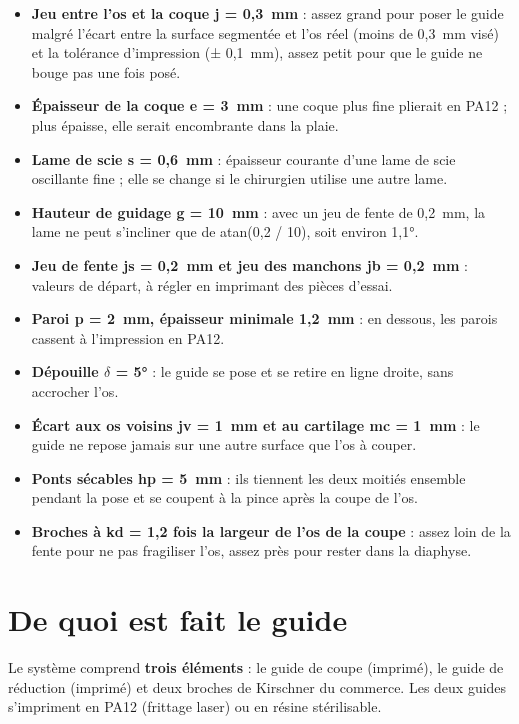 \documentclass[11pt,a4paper]{article}
\begin{document}
\begin{itemize}
  \item \textbf{Jeu entre l'os et la coque j = 0,3~mm} : assez grand pour poser le guide malgré l'écart entre la
        surface segmentée et l'os réel (moins de 0,3~mm visé) et la tolérance d'impression (± 0,1~mm), assez petit pour
        que le guide ne bouge pas une fois posé.
  \item \textbf{Épaisseur de la coque e = 3~mm} : une coque plus fine plierait en PA12 ; plus épaisse, elle serait
        encombrante dans la plaie.
  \item \textbf{Lame de scie s = 0,6~mm} : épaisseur courante d'une lame de scie oscillante fine ; elle se change si
        le chirurgien utilise une autre lame.
  \item \textbf{Hauteur de guidage g = 10~mm} : avec un jeu de fente de 0,2~mm, la lame ne peut s'incliner que de
        atan(0,2 / 10), soit environ 1,1°.
  \item \textbf{Jeu de fente js = 0,2~mm et jeu des manchons jb = 0,2~mm} : valeurs de départ, à régler en
        imprimant des pièces d'essai.
  \item \textbf{Paroi p = 2~mm, épaisseur minimale 1,2~mm} : en dessous, les parois cassent à l'impression en PA12.
  \item \textbf{Dépouille $\delta$ = 5°} : le guide se pose et se retire en ligne droite, sans accrocher l'os.
  \item \textbf{Écart aux os voisins jv = 1~mm et au cartilage mc = 1~mm} : le guide ne repose jamais sur une autre
        surface que l'os à couper.
  \item \textbf{Ponts sécables hp = 5~mm} : ils tiennent les deux moitiés ensemble pendant la pose et se coupent à la
        pince après la coupe de l'os.
  \item \textbf{Broches à kd = 1,2 fois la largeur de l'os de la coupe} : assez loin de la fente pour ne pas fragiliser
        l'os, assez près pour rester dans la diaphyse.
\end{itemize}

\section{De quoi est fait le guide}

Le système comprend \textbf{trois éléments} : le guide de coupe (imprimé), le guide de réduction (imprimé) et deux
broches de Kirschner du commerce. Les deux guides s'impriment en PA12 (frittage laser) ou en résine stérilisable.
\end{document}
